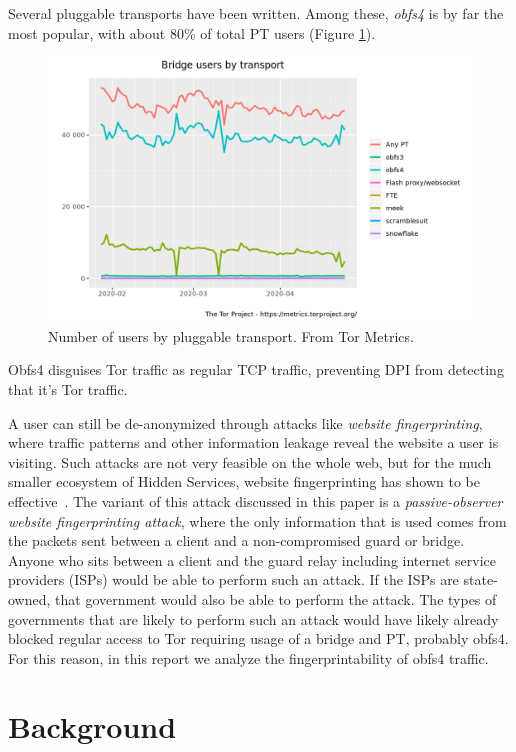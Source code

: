 \documentclass[11pt]{article}
\begin{document}
Several pluggable transports have been written. Among these, \textit{obfs4} is by far the most popular, with about 80\% of total PT users (Figure \ref{pts}).
\begin{figure}[tb] \label{pts}
    \centering
    \includegraphics[scale=.6]{ptusage}
    \caption[]{Number of users by pluggable transport. From Tor Metrics.\footnotemark}
\end{figure}
Obfs4 disguises Tor traffic as regular TCP traffic, preventing DPI from detecting that it's Tor traffic.

A user can still be de-anonymized through attacks like \textit{website fingerprinting}, where traffic patterns and other information leakage reveal the website a user is visiting. Such attacks are not very feasible on the whole web, but for the much smaller ecosystem of Hidden Services, website fingerprinting has shown to be effective~\cite{panchenko, wang}.
The variant of this attack discussed in this paper is a \textit{passive-observer website fingerprinting attack}, where the only information that is used comes from the packets sent between a client and a non-compromised guard or bridge. Anyone who sits between a client and the guard relay including internet service providers (ISPs) would be able to perform such an attack. If the ISPs are state-owned, that government would also be able to perform the attack. The types of governments that are likely to perform such an attack would have likely already blocked regular access to Tor requiring usage of a bridge and PT, probably obfs4. For this reason, in this report we analyze the fingerprintability of obfs4 traffic.

\section{Background}
\end{document}
